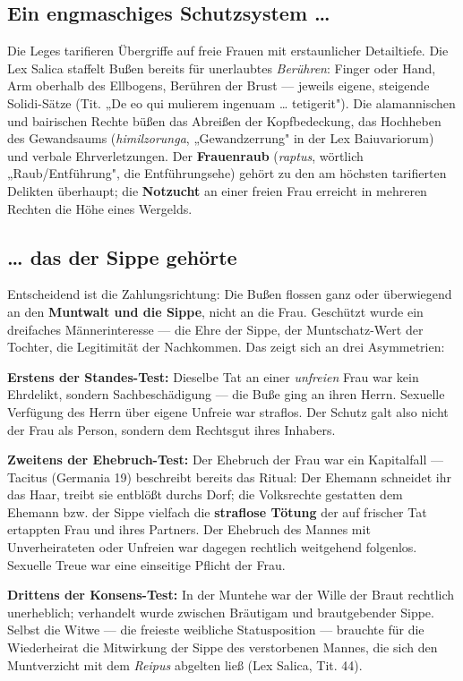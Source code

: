 \documentclass[11pt,a4paper,ngerman]{scrartcl}
\newcommand{\chipbase}[2]{\hspace{0pt}{\footnotesize\textcolor{#1}{[\textsc{#2}]}}}
\newcommand{\chipbelegt}[1]{\chipbase{chipgreen}{#1}}
\begin{document}
\subsection*{Ein engmaschiges Schutzsystem …}

Die Leges tarifieren Übergriffe auf freie Frauen mit erstaunlicher Detailtiefe. Die Lex Salica staffelt Bußen bereits für unerlaubtes \emph{Berühren}: Finger oder Hand, Arm oberhalb des Ellbogens, Berühren der Brust — jeweils eigene, steigende Solidi-Sätze (Tit. „De eo qui mulierem ingenuam … tetigerit"). Die alamannischen und bairischen Rechte büßen das Abreißen der Kopfbedeckung, das Hochheben des Gewandsaums (\emph{himilzorunga}, „Gewandzerrung" in der Lex Baiuvariorum) und verbale Ehrverletzungen. Der \textbf{Frauenraub} (\emph{raptus}, wörtlich „Raub/Entführung", die Entführungsehe) gehört zu den am höchsten tarifierten Delikten überhaupt; die \textbf{Notzucht} an einer freien Frau erreicht in mehreren Rechten die Höhe eines Wergelds. \chipbelegt{belegt}

\subsection*{… das der Sippe gehörte}

Entscheidend ist die Zahlungsrichtung: Die Bußen flossen ganz oder überwiegend an den \textbf{Muntwalt und die Sippe}, nicht an die Frau. Geschützt wurde ein dreifaches Männerinteresse — die Ehre der Sippe, der Muntschatz-Wert der Tochter, die Legitimität der Nachkommen. Das zeigt sich an drei Asymmetrien: \chipbelegt{belegt}

\textbf{Erstens der Standes-Test:} Dieselbe Tat an einer \emph{unfreien} Frau war kein Ehrdelikt, sondern Sachbeschädigung — die Buße ging an ihren Herrn. Sexuelle Verfügung des Herrn über eigene Unfreie war straflos. Der Schutz galt also nicht der Frau als Person, sondern dem Rechtsgut ihres Inhabers.

\textbf{Zweitens der Ehebruch-Test:} Der Ehebruch der Frau war ein Kapitalfall — Tacitus (Germania 19) beschreibt bereits das Ritual: Der Ehemann schneidet ihr das Haar, treibt sie entblößt durchs Dorf; die Volksrechte gestatten dem Ehemann bzw. der Sippe vielfach die \textbf{straflose Tötung} der auf frischer Tat ertappten Frau und ihres Partners. Der Ehebruch des Mannes mit Unverheirateten oder Unfreien war dagegen rechtlich weitgehend folgenlos. Sexuelle Treue war eine einseitige Pflicht der Frau. \chipbelegt{belegt}

\textbf{Drittens der Konsens-Test:} In der Muntehe war der Wille der Braut rechtlich unerheblich; verhandelt wurde zwischen Bräutigam und brautgebender Sippe. Selbst die Witwe — die freieste weibliche Statusposition — brauchte für die Wiederheirat die Mitwirkung der Sippe des verstorbenen Mannes, die sich den Muntverzicht mit dem \emph{Reipus} abgelten ließ (Lex Salica, Tit. 44). \chipbelegt{belegt}
\end{document}
